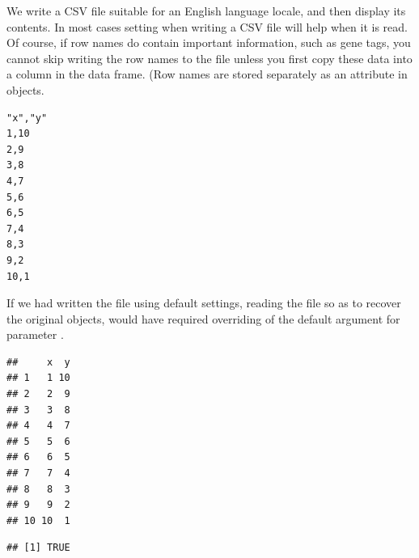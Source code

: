 \documentclass[krantz2,ChapterTOCs]{krantz}\usepackage{knitr}
\begin{document}
We write a CSV file suitable for an English language locale, and then display its contents. In most cases setting  when writing a CSV file will help when it is read. Of course, if row names do contain important information, such as gene tags, you cannot skip writing the row names to the file unless you first copy these data into a column in the data frame. (Row names are stored separately as an attribute in  objects.
\begin{knitrout}\footnotesize
{}\color{fgcolor}\begin{kframe}
\begin{alltt}
  \hlstd{=} \hlstd{,}  \hlstd{=} \hlstd{)}
\hlstd{(}\hlstd{,}  \hlstd{=} \hlstd{)}
\end{alltt}
\end{kframe}
\end{knitrout}

\begin{knitrout}\footnotesize
{}\color{fgcolor}\begin{kframe}
\begin{verbatim}
"x","y"
1,10
2,9
3,8
4,7
5,6
6,5
7,4
8,3
9,2
10,1
\end{verbatim}
\end{kframe}
\end{knitrout}

If we had written the file using default settings, reading the file so as to recover the original objects, would have required overriding of the default argument for parameter .
\begin{knitrout}\footnotesize
{}\color{fgcolor}\begin{kframe}
\begin{alltt}
 \hlkwb{<-} \hlstd{(} \hlstd{=} \hlstd{)}
\end{alltt}
\begin{verbatim}
##     x  y
## 1   1 10
## 2   2  9
## 3   3  8
## 4   4  7
## 5   5  6
## 6   6  5
## 7   7  4
## 8   8  3
## 9   9  2
## 10 10  1
\end{verbatim}
\begin{alltt}
  \hlstd{=} \hlstd{)}
\end{alltt}
\begin{verbatim}
## [1] TRUE
\end{verbatim}
\end{kframe}
\end{knitrout}
\end{document}

